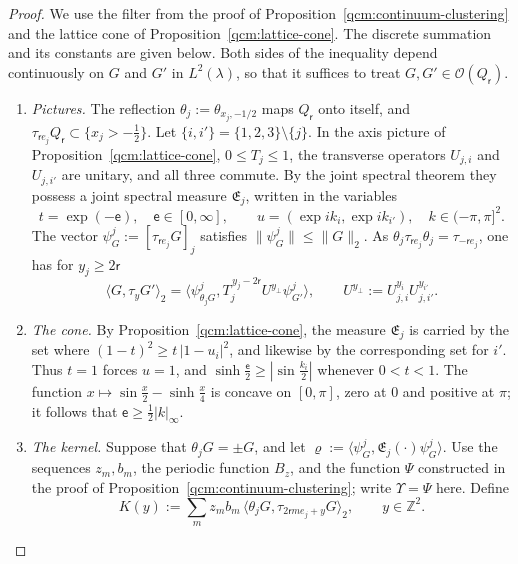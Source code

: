 \documentclass[11pt,letterpaper,reqno]{amsart}
\theoremstyle{definition}
\begin{document}
\begin{proof}
We use the filter from the proof of Proposition~\ref{qcm:continuum-clustering} and the lattice cone of Proposition~\ref{qcm:lattice-cone}. The discrete summation and its constants are given below.
Both sides of the inequality depend continuously on $G$ and $G'$ in $L^2(\lambda)$, so that it suffices to treat $G,G'\in\mathcal O(Q_{\mathsf r})$.
\begin{enumerate}
\item[1.] \emph{Pictures.}
The reflection $\theta_j:=\theta_{x_j,-1/2}$ maps $Q_{\mathsf r}$ onto itself, and $\tau_{\mathsf re_j}Q_{\mathsf r}\subset\{x_j>-\frac12\}$.
Let $\{i,i'\}=\{1,2,3\}\setminus\{j\}$.
In the axis picture of Proposition~\ref{qcm:lattice-cone}, $0\le T_j\le1$, the transverse operators $U_{j,i}$ and $U_{j,i'}$ are unitary, and all three commute.
By the joint spectral theorem they possess a joint spectral measure $\mathfrak E_j$, written in the variables
\begin{equation*}
t=\exp(-\mathsf e),\quad\mathsf e\in[0,\infty],\qquad u=(\exp ik_i,\exp ik_{i'}),\quad k\in(-\pi,\pi]^2.
\end{equation*}
The vector $\psi^j_G:=[\tau_{\mathsf re_j}G]_j$ satisfies $\|\psi^j_G\|\le\|G\|_2$.
As $\theta_j\tau_{\mathsf re_j}\theta_j=\tau_{-\mathsf re_j}$, one has for $y_j\ge2\mathsf r$
\begin{equation*}
\langle G,\tau_yG'\rangle_2=\bigl\langle\psi^j_{\theta_jG},T_j^{\,y_j-2\mathsf r}U^{y_\perp}\psi^j_{G'}\bigr\rangle,\qquad U^{y_\perp}:=U_{j,i}^{y_i}U_{j,i'}^{y_{i'}}.
\end{equation*}
\item[2.] \emph{The cone.}
By Proposition~\ref{qcm:lattice-cone}, the measure $\mathfrak E_j$ is carried by the set where $(1-t)^2\ge t\,|1-u_i|^2$, and likewise by the corresponding set for $i'$.
Thus $t=1$ forces $u=1$, and $\sinh\frac{\mathsf e}2\ge|\sin\frac{k_i}2|$ whenever $0<t<1$.
The function $x\mapsto\sin\frac x2-\sinh\frac x4$ is concave on $[0,\pi]$, zero at $0$ and positive at $\pi$; it follows that $\mathsf e\ge\frac12|k|_\infty$.
\item[3.] \emph{The kernel.}
Suppose that $\theta_jG=\pm G$, and let $\varrho:=\langle\psi^j_G,\mathfrak E_j(\cdot)\psi^j_G\rangle$.
Use the sequences $z_m,b_m$, the periodic function $B_z$, and the function $\Psi$ constructed in the proof of Proposition~\ref{qcm:continuum-clustering}; write $\Upsilon=\Psi$ here. Define
\begin{equation*}
K(y):=\sum_mz_mb_m\,\langle\theta_jG,\tau_{2\mathsf rme_j+y}G\rangle_2,\qquad y\in\mathbb Z^2.

\end{equation*}
\end{enumerate}
\end{proof}
\end{document}
